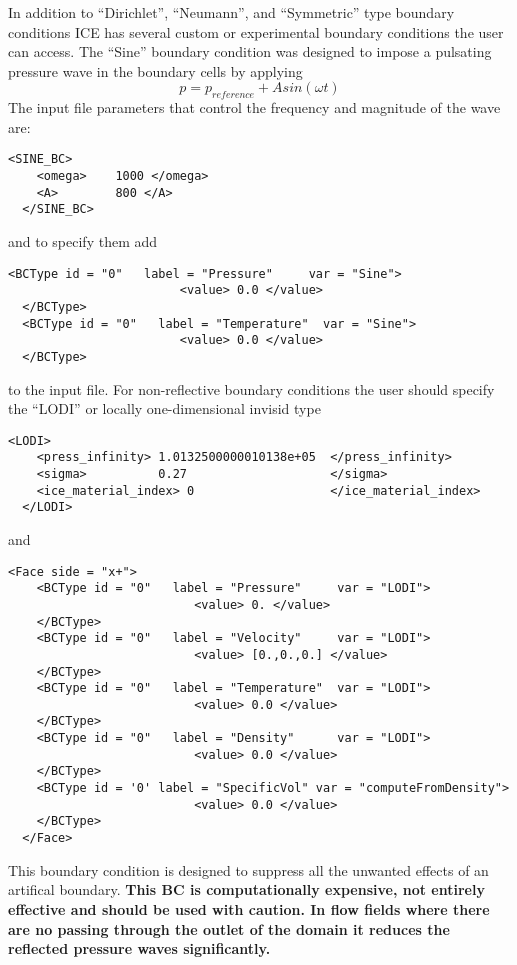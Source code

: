 %
In addition to ``Dirichlet'', ``Neumann'', and ``Symmetric'' type boundary conditions ICE has several custom or experimental  boundary conditions the user can access.  The ``Sine'' boundary condition was designed to impose a pulsating pressure wave in the boundary cells by applying
%
\begin{equation} \label{eq:pSine}
  p = p_{reference} + A  sin(\omega t)
\end{equation}
%
The input file parameters that control the frequency and magnitude of the  wave are: 
%
\begin{Verbatim}[fontsize=\footnotesize]
  <SINE_BC>
    <omega>    1000 </omega>
    <A>        800 </A>
  </SINE_BC>
\end{Verbatim}
%
and to specify them add
%
\begin{Verbatim}[fontsize=\footnotesize]
  <BCType id = "0"   label = "Pressure"     var = "Sine"> 
                        <value> 0.0 </value> 
  </BCType> 
  <BCType id = "0"   label = "Temperature"  var = "Sine"> 
                        <value> 0.0 </value>
  </BCType>
\end{Verbatim}
%
to the input file.
%
For non-reflective boundary conditions the user should specify the ``LODI'' or locally one-dimensional invisid type \cite{ref:Sutherland}
%
\begin{Verbatim}[fontsize=\footnotesize]
  <LODI>
    <press_infinity> 1.0132500000010138e+05  </press_infinity>
    <sigma>          0.27                    </sigma>
    <ice_material_index> 0                   </ice_material_index>
  </LODI>
\end{Verbatim}
%
and
%
\begin{Verbatim}[fontsize=\footnotesize]
  <Face side = "x+">
    <BCType id = "0"   label = "Pressure"     var = "LODI">
                          <value> 0. </value>                
    </BCType>
    <BCType id = "0"   label = "Velocity"     var = "LODI">
                          <value> [0.,0.,0.] </value>
    </BCType>
    <BCType id = "0"   label = "Temperature"  var = "LODI">
                          <value> 0.0 </value>
    </BCType>
    <BCType id = "0"   label = "Density"      var = "LODI">
                          <value> 0.0 </value>
    </BCType>
    <BCType id = '0' label = "SpecificVol" var = "computeFromDensity">
                          <value> 0.0 </value>
    </BCType>
  </Face> 
\end{Verbatim}
%
This boundary condition is designed to suppress all the unwanted effects of an artifical boundary. \bf This BC is computationally expensive, not entirely effective and should be used with caution\normalfont.  In flow fields where there are no passing through the outlet of the domain it reduces the reflected pressure waves significantly.

